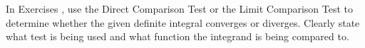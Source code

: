 {\noindent In Exercises}
{, use the Direct Comparison Test or the Limit Comparison Test to determine whether the given definite integral converges or diverges. Clearly state what test is being used and what function the integrand is being compared to.}
